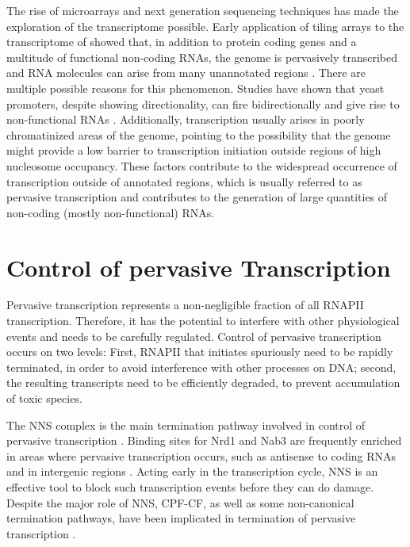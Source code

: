 

The rise of microarrays and next generation sequencing techniques has made the exploration of the transcriptome possible. 
Early application of tiling arrays to the transcriptome of \cer{} showed that, in addition to protein coding genes and a multitude of functional non-coding RNAs, the genome is pervasively transcribed and RNA molecules can arise from many unannotated regions \cite{xu:2009:bidirectional, neil:2009:widespread,david:2006:highresolution}. 
There are multiple possible reasons for this phenomenon. 
Studies have shown that yeast promoters, despite showing directionality, can fire bidirectionally and give rise to non-functional RNAs \cite{xu:2009:bidirectional, neil:2009:widespread}. 
Additionally, transcription usually arises in poorly chromatinized areas of the genome, pointing to the possibility that the genome might provide a low barrier to transcription initiation outside regions of high nucleosome occupancy. 
These factors contribute to the widespread occurrence of transcription outside of annotated regions, which is usually referred to as pervasive transcription and contributes to the generation of large quantities of non-coding (mostly non-functional) RNAs. 

\section{Control of pervasive Transcription}

Pervasive transcription represents a non-negligible fraction of all RNAPII transcription. 
Therefore, it has the potential to interfere with other physiological events and needs to be carefully regulated. 
Control of pervasive transcription occurs on two levels: First, RNAPII that initiates spuriously need to be rapidly terminated, in order to avoid interference with other processes on DNA; second, the resulting transcripts need to be efficiently degraded, to prevent accumulation of toxic species. 

The NNS complex is the main termination pathway involved in control of pervasive transcription \cite{arigo:2006:regulation, thiebaut:2006:transcription}. 
Binding sites for Nrd1 and Nab3 are frequently enriched in areas where pervasive transcription occurs, such as antisense to coding RNAs and in intergenic regions \cite{thiebaut:2006:transcription}. 
Acting early in the transcription cycle, NNS is an effective tool to block such transcription events before they can do damage. 
Despite the major role of NNS, CPF-CF, as well as some non-canonical termination pathways, have been implicated in termination of pervasive transcription \cite{marquardt:2011:distinct, vandijk:2011:xuts,colin:2014:roadblock}.

